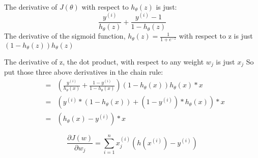 The derivative of $J(\theta)$ with respect to $h_{\theta}(z)$ is just:
$$
\frac{y^{(i)}}{h_{\theta}(z)}+\frac{y^{(i)}-1}{1-h_{\theta}(z)}
$$
The derivative of the sigmoid function, $h_{\theta}(z)=\frac{1}{1+e^{-z}}$ with
respect to z is just $(1-h_{\theta}(z))h_{\theta}(z)$

The derivative of z, the dot product, with respect to any weight $w_j$ is just $x_j$
So put those three above derivatives in the chain rule:
\begin{eqnarray*}
&=&\left(\frac{y^{(i)}}{h_{\theta}(x)}+\frac{1-y^{(i)}}{1-h_{\theta}(x)}\right)(1-h_{\theta}(x))h_{\theta}(x)*x\\
&=&(y^{(i)}*(1-h_{\theta}(x))+(1-y^{(i)})*h_{\theta}(x))*x\\
&=&(h_{\theta}(x)-y^{(i)})*x
\end{eqnarray*}

$$
\frac{\partial J(w)}{\partial w_j}=\sum^n_{i=1}x^{(i)}_j(h(x^{(i)})-y^{(i)})
$$
